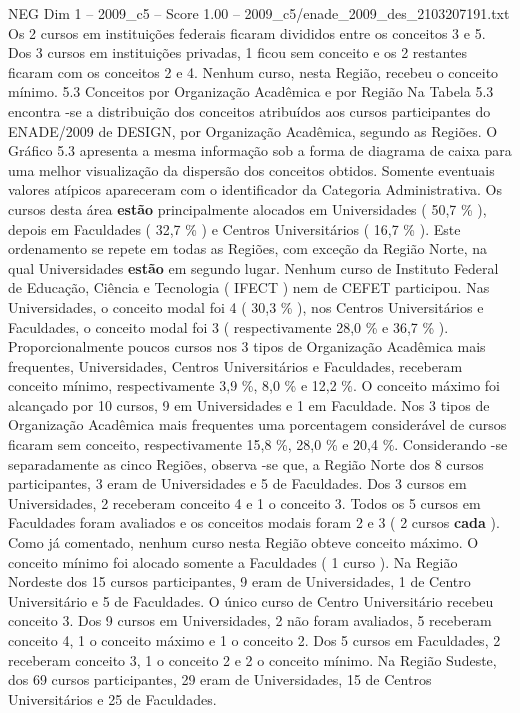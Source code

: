 \begin{textsample}{NEG Dim 1 – 2009\_c5 – Score 1.00 – 2009\_c5/enade\_2009\_des\_2103207191.txt}
Os 2 cursos em instituições federais ficaram divididos entre os conceitos 3 e 5.
Dos 3 cursos em instituições privadas, 1 ficou sem conceito e os 2 restantes ficaram com os conceitos 2 e 4.
Nenhum curso, nesta Região, recebeu o conceito mínimo. 5.3 Conceitos por Organização Acadêmica e por Região Na Tabela 5.3 encontra -se a distribuição dos conceitos atribuídos aos cursos participantes do ENADE/2009 de DESIGN, por Organização Acadêmica, segundo as Regiões.
O Gráfico 5.3 apresenta a mesma informação sob a forma de diagrama de caixa para uma melhor visualização da dispersão dos conceitos obtidos.
Somente eventuais valores atípicos apareceram com o identificador da Categoria Administrativa.
Os cursos desta área \textbf{estão} principalmente alocados em Universidades ( 50,7 \% ), depois em Faculdades ( 32,7 \% ) e Centros Universitários ( 16,7 \% ).
Este ordenamento se repete em todas as Regiões, com exceção da Região Norte, na qual Universidades \textbf{estão} em segundo lugar.
Nenhum curso de Instituto Federal de Educação, Ciência e Tecnologia ( IFECT ) nem de CEFET participou.
Nas Universidades, o conceito modal foi 4 ( 30,3 \% ), nos Centros Universitários e Faculdades, o conceito modal foi 3 ( respectivamente 28,0 \% e 36,7 \% ).
Proporcionalmente poucos cursos nos 3 tipos de Organização Acadêmica mais frequentes, Universidades, Centros Universitários e Faculdades, receberam conceito mínimo, respectivamente 3,9 \%, 8,0 \% e 12,2 \%.
O conceito máximo foi alcançado por 10 cursos, 9 em Universidades e 1 em Faculdade.
Nos 3 tipos de Organização Acadêmica mais frequentes uma porcentagem considerável de cursos ficaram sem conceito, respectivamente 15,8 \%, 28,0 \% e 20,4 \%.
Considerando -se separadamente as cinco Regiões, observa -se que, a Região Norte dos 8 cursos participantes, 3 eram de Universidades e 5 de Faculdades.
Dos 3 cursos em Universidades, 2 receberam conceito 4 e 1 o conceito 3.
Todos os 5 cursos em Faculdades foram avaliados e os conceitos modais foram 2 e 3 ( 2 cursos \textbf{cada} ).
Como já comentado, nenhum curso nesta Região obteve conceito máximo.
O conceito mínimo foi alocado somente a Faculdades ( 1 curso ).
Na Região Nordeste dos 15 cursos participantes, 9 eram de Universidades, 1 de Centro Universitário e 5 de Faculdades.
O único curso de Centro Universitário recebeu conceito 3.
Dos 9 cursos em Universidades, 2 não foram avaliados, 5 receberam conceito 4, 1 o conceito máximo e 1 o conceito 2.
Dos 5 cursos em Faculdades, 2 receberam conceito 3, 1 o conceito 2 e 2 o conceito mínimo.
Na Região Sudeste, dos 69 cursos participantes, 29 eram de Universidades, 15 de Centros Universitários e 25 de Faculdades.

\end{textsample}
